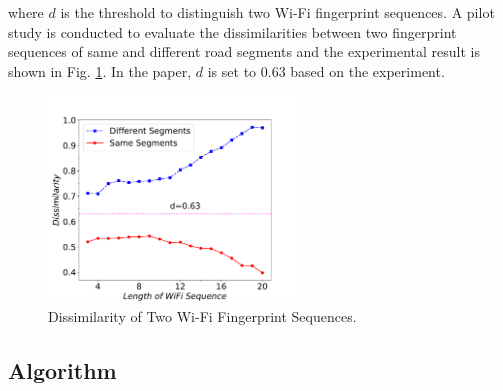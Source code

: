 \documentclass[conference]{IEEEtran}
\begin{document}
where $d$ is the threshold to distinguish two Wi-Fi fingerprint sequences. A pilot study is conducted to evaluate the dissimilarities between two fingerprint sequences of same and different road segments and the experimental result is shown in Fig. \ref{fig-wifidist}. In the paper, $d$ is set to $0.63$ based on the experiment. 

\begin{figure}[!htbp]
	\centering
		\includegraphics[width=2.58in]{AiFiMatch-WiFiDist}
		\caption{Dissimilarity of Two Wi-Fi Fingerprint Sequences.}
	\label{fig-wifidist}
\end{figure}

\subsection{Algorithm}
\end{document}
